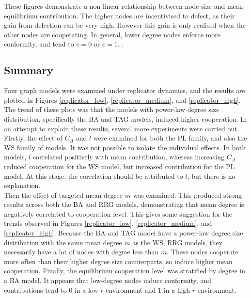 These figures demonstrate a non-linear relationship between node size and mean equilibrium contribution. The higher nodes are incentivised to defect, as their gain from defection can be very high. However this gain is only realised when the other nodes are cooperating. In general, lower degree nodes enforce more conformity, and tend to $c=0$ or $c=1$. . \\

\subsection{Summary}
Four graph models were examined under replicator dynamics, and the results are plotted in Figures \ref{replicator_low}, \ref{replicator_medium}, and \ref{replicator_high}. The trend of these plots was that the models with power-law degree size distribution, specifically the BA and TAG models, induced higher cooperation. In an attempt to explain these results, several more experiments were carried out. \\

Firstly, the effect of $C_\Delta$ and $l$ were examined for both the PL family, and also the WS family of models. It was not possible to isolate the individual effects. In both models, $l$ correlated positively with mean contribution, whereas increasing $C_\Delta$ reduced cooperation for the WS model, but increased contribution for the PL model. At this stage, the correlation should be attributed to $l$, but there is no explanation. \\

Then the effect of targeted mean degree $m$ was examined. This produced strong results across both the BA and RRG models, demonstrating that mean degree is negatively correlated to cooperation level. This gives some suggestion for the trends observed in Figures \ref{replicator_low}, \ref{replicator_medium}, and \ref{replicator_high}. Because the BA and TAG model have a power-law degree size distribution with the same mean degree $m$ as the WS, RRG models, they necessarily have a lot of nodes with degree less than $m$. These nodes cooperate more often than their higher degree size counterparts, so induce higher mean cooperation. Finally, the equilibrium cooperation level was stratified by degree in a BA model. It appears that low-degree nodes induce conformity, and contributions tend to 0 in a low-$r$ environment and 1 in a high-$r$ environment.  

